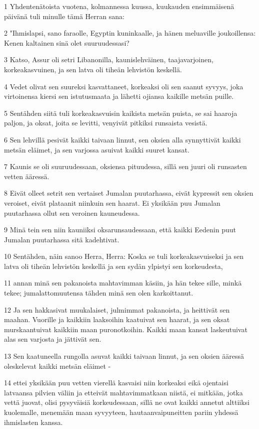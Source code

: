 \par 1 Yhdentenätoista vuotena, kolmannessa kuussa, kuukauden ensimmäisenä päivänä tuli minulle tämä Herran sana:
\par 2 "Ihmislapsi, sano faraolle, Egyptin kuninkaalle, ja hänen meluaville joukoillensa: Kenen kaltainen sinä olet suuruudessasi?
\par 3 Katso, Assur oli setri Libanonilla, kaunislehväinen, taajavarjoinen, korkeakasvuinen, ja sen latva oli tiheän lehvistön keskellä.
\par 4 Vedet olivat sen suureksi kasvattaneet, korkeaksi oli sen saanut syvyys, joka virtoinensa kiersi sen istutusmaata ja lähetti ojiansa kaikille metsän puille.
\par 5 Sentähden siitä tuli korkeakasvuisin kaikista metsän puista, se sai haaroja paljon, ja oksat, joita se levitti, venyivät pitkiksi runsaista vesistä.
\par 6 Sen lehvillä pesivät kaikki taivaan linnut, sen oksien alla synnyttivät kaikki metsän eläimet, ja sen varjossa asuivat kaikki suuret kansat.
\par 7 Kaunis se oli suuruudessaan, oksiensa pituudessa, sillä sen juuri oli runsasten vetten ääressä.
\par 8 Eivät olleet setrit sen vertaiset Jumalan puutarhassa, eivät kypressit sen oksien veroiset, eivät plataanit niinkuin sen haarat. Ei yksikään puu Jumalan puutarhassa ollut sen veroinen kauneudessa.
\par 9 Minä tein sen niin kauniiksi oksarunsaudessaan, että kaikki Eedenin puut Jumalan puutarhassa sitä kadehtivat.
\par 10 Sentähden, näin sanoo Herra, Herra: Koska se tuli korkeakasvuiseksi ja sen latva oli tiheän lehvistön keskellä ja sen sydän ylpistyi sen korkeudesta,
\par 11 annan minä sen pakanoista mahtavimman käsiin, ja hän tekee sille, minkä tekee; jumalattomuutensa tähden minä sen olen karkoittanut.
\par 12 Ja sen hakkasivat muukalaiset, julmimmat pakanoista, ja heittivät sen maahan. Vuorille ja kaikkiin laaksoihin kaatuivat sen haarat, ja sen oksat murskaantuivat kaikkiin maan puronotkoihin. Kaikki maan kansat laskeutuivat alas sen varjosta ja jättivät sen.
\par 13 Sen kaatuneella rungolla asuvat kaikki taivaan linnut, ja sen oksien ääressä oleskelevat kaikki metsän eläimet -
\par 14 ettei yksikään puu vetten vierellä kasvaisi niin korkeaksi eikä ojentaisi latvaansa pilvien väliin ja etteivät mahtavimmatkaan niistä, ei mitkään, jotka vettä juovat, olisi pysyväisiä korkeudessaan, sillä ne ovat kaikki annetut alttiiksi kuolemalle, menemään maan syvyyteen, hautaanvaipuneitten pariin yhdessä ihmislasten kanssa.
